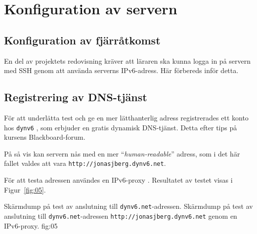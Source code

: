 %
%
%


\section{Konfiguration av servern}
\subsection{Konfiguration av fjärråtkomst}
En del av projektets redovisning kräver att läraren ska kunna logga in på servern
med SSH genom att använda serverns IPv6-adress. Här förbereds inför detta.


\subsection{Registrering av DNS-tjänst}
För att underlätta test och ge en mer lätthanterlig adress registrerades ett
konto hos \texttt{dynv6} \cite{ipv6:dynv6}, som erbjuder en gratis dynamisk
DNS-tjänst. Detta efter tips på kursens Blackboard-forum.

På så vis kan servern nås med en mer ``\emph{human-readable}'' adress,
som i det här fallet valdes att vara \texttt{http://jonasjberg.dynv6.net}.

För att testa adressen användes en IPv6-proxy \cite{ipv6:ipv6proxy}.
Resultatet av testet visas i Figur~\ref{fig:05}.

           {Skärmdump på test av anslutning till \texttt{dynv6.net}-adressen.}
           {Skärmdump på test av anslutning till \texttt{dynv6.net}-adressen 
					  \texttt{http://jonasjberg.dynv6.net} genom en IPv6-proxy.}
           {fig:05}


